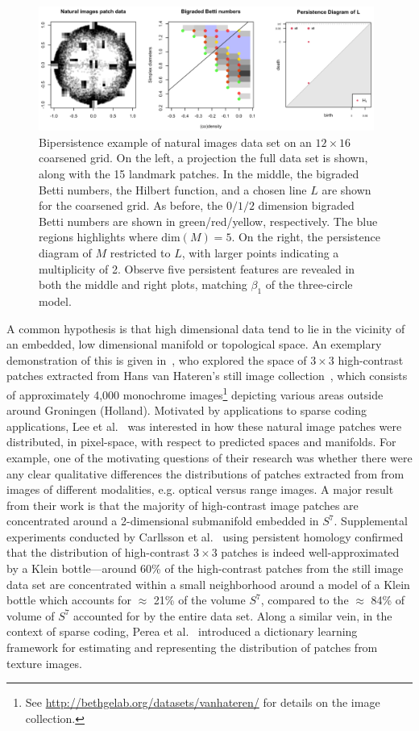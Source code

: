 \documentclass{siamart190516}
\begin{document}
 \begin{figure}[t]
	\includegraphics[width=0.98\textwidth]{natural_images}
	\caption{Bipersistence example of natural images data set on an $12 \times 16$ coarsened grid. On the left, a projection the full data set is shown, along with the 15 landmark patches. In the middle, the bigraded Betti numbers, the Hilbert function, and a chosen line $L$ are shown for the coarsened grid. As before, the $0/1/2$ dimension bigraded Betti numbers are shown in green/red/yellow, respectively. The blue regions highlights where $\mathrm{dim}(M) = 5$. On the right, the persistence diagram of $M$ restricted to $L$, with larger points indicating a multiplicity of 2. Observe five persistent features are revealed in both the middle and right plots, matching $\beta_1$ of the three-circle model. }
	\label{fig:patch_data_dgm}
\end{figure}

A common hypothesis is that high dimensional data tend to lie in the vicinity of an embedded, low dimensional manifold or topological space. An exemplary demonstration of this is given in~\cite{lee2003nonlinear}, who explored the space of $3 \times 3$ high-contrast patches extracted from Hans van Hateren's still image collection~\cite{hateren_schaaf_1998}, which consists of approximately 4,000 monochrome images\footnote{See \url{http://bethgelab.org/datasets/vanhateren/} for details on the image collection.} depicting various areas outside around Groningen (Holland). Motivated by applications to sparse coding applications, Lee et al.~\cite{lee2003nonlinear} was interested in how these natural image patches were distributed, in pixel-space, with respect to predicted spaces and manifolds. For example, one of the motivating questions of their research was whether there were any clear qualitative differences the distributions of patches extracted from from images of different modalities, e.g. optical versus range images. A major result from their work is that the majority of high-contrast image patches are concentrated around a 2-dimensional submanifold embedded in $S^7$.
Supplemental experiments conducted by Carllsson et al.~\cite{carlsson2008local} using persistent homology confirmed that the distribution of high-contrast $3 \times 3$ patches is indeed well-approximated by a Klein bottle---around 60\% of the high-contrast patches from the still image data set are concentrated within a small neighborhood around a model of a Klein bottle which accounts for $\approx$ 21\% of the volume $S^7$, compared to the $\approx$ 84\% of volume of $S^7$ accounted for by the entire data set. Along a similar vein, in the context of sparse coding, Perea et al.~\cite{perea2014klein} introduced a dictionary learning framework for estimating and representing the distribution of patches from texture images. 
\end{document}
